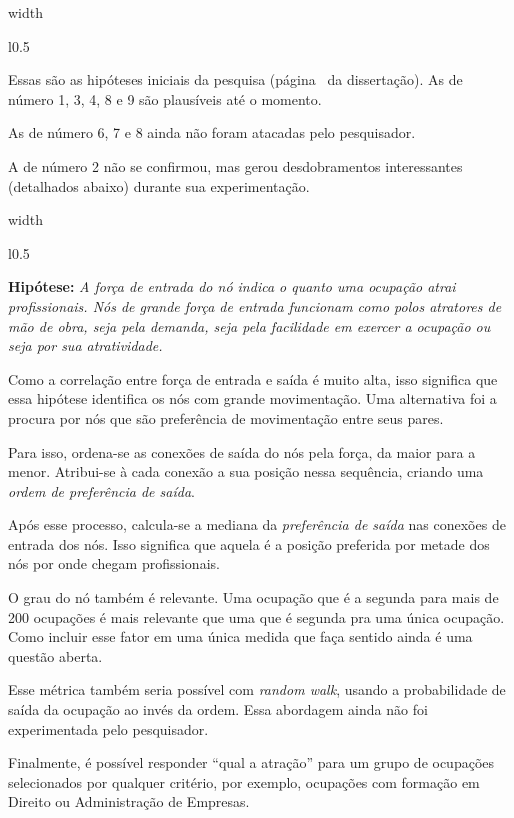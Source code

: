 \documentclass[10pt,a4paper,final]{article}
\newcommand\disappearingrule{%
  \par %
  \vskip10pt %
  \leaders\vrule width \textwidth\vskip0.4pt %
  \nointerlineskip %
  \vskip10pt %
}
\newenvironment{slideshort}[1]
{
  \disappearingrule
  
  \begin{minipage}[t][18\baselineskip]{\linewidth}
    \setlength{\parskip}{1ex}
    \begin{wrapfigure}{l}{0.5\textwidth}
      \includeslide[width=0.48\textwidth]{#1}
      \label{sde:#1}
    \end{wrapfigure}}
{\end{minipage}}
\newenvironment{slidelong}[1]
{
  \disappearingrule
  
  \begin{minipage}[t]{\linewidth}
    \setlength{\parskip}{1ex}
    \begin{wrapfigure}{l}{0.5\textwidth}
      \includeslide[width=0.48\textwidth]{#1}%
      \vspace{-0.8cm}
      \label{sde:#1}
    \end{wrapfigure}}
    {\end{minipage}}
\begin{document}
\begin{slideshort}{hipoteses}
  
  Essas são as hipóteses iniciais da pesquisa (página~\pageref{sec:resultados-preliminares} da dissertação). As de número 1, 3, 4, 8 e 9 são plausíveis até o momento.
  
  As de número 6, 7 e 8 ainda não foram atacadas pelo pesquisador.
  
  A de número 2 não se confirmou, mas gerou desdobramentos interessantes (detalhados abaixo) durante sua experimentação.
\end{slideshort}

\begin{slidelong}{hipotese-atracao}
  \textbf{Hipótese:} \textit{A força de entrada do nó indica o quanto uma ocupação atrai profissionais. Nós de grande força de entrada funcionam como polos atratores de mão de obra, seja pela demanda, seja pela facilidade em exercer a ocupação ou seja por sua atratividade.}
  
  Como a correlação entre força de entrada e saída é muito alta, isso significa que essa hipótese identifica os nós com grande movimentação. Uma alternativa foi a procura por nós que são preferência de movimentação entre seus pares.

  Para isso, ordena-se as conexões de saída do nós pela força, da maior para a menor. Atribui-se à cada conexão a sua posição nessa sequência, criando uma \textit{ordem de preferência de saída}.
  
  Após esse processo, calcula-se a mediana da \textit{preferência de saída} nas conexões de entrada dos nós. Isso significa que aquela é a posição preferida por metade dos nós por onde chegam profissionais.
  
  O grau do nó também é relevante. Uma ocupação que é a segunda para mais de 200 ocupações é mais relevante que uma que é segunda pra uma única ocupação. Como incluir esse fator em uma única medida que faça sentido ainda é uma questão aberta.
  
  Esse métrica também seria possível com \textit{random walk}, usando a probabilidade de saída da ocupação ao invés da ordem. Essa abordagem ainda não foi experimentada pelo pesquisador.
  
  Finalmente, é possível responder \enquote{qual a atração} para um grupo de ocupações selecionados por qualquer critério, por exemplo, ocupações com formação em Direito ou Administração de Empresas.
\end{slidelong}
\end{document}
